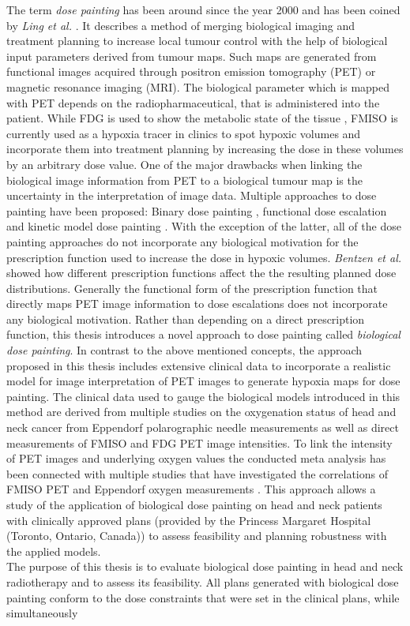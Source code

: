 The term \textit{dose painting} has been around since the year 2000 and has been coined by \textit{Ling et al.} \cite{pmid10837935}. It describes a method of merging biological imaging and treatment planning to increase local tumour control with the help of biological input parameters derived from tumour maps. Such maps are generated from functional images acquired through positron emission tomography (PET) or magnetic resonance imaging (MRI). The biological parameter which is mapped with PET depends on the radiopharmaceutical, that is administered into the patient. While FDG is used to show the metabolic state of the tissue \cite{pmid16841141}, FMISO is currently used as a hypoxia tracer in clinics to spot hypoxic volumes and incorporate them into treatment planning by increasing the dose in these volumes by an arbitrary dose value. One of the major drawbacks when linking the biological image information from PET to a biological tumour map is the uncertainty in the interpretation of image data. Multiple approaches to dose painting have been proposed: Binary dose painting \cite{pmid20855118, pmid11240261, pmid17869020}, functional dose escalation \cite{pmid12587912, pmid21356478, pmid20643512, pmid18635895} and kinetic model dose painting \cite{pmid17448882}. With the exception of the latter, all of the dose painting approaches do not incorporate any biological motivation for the prescription function used to increase the dose in hypoxic volumes. \textit{Bentzen et al.} \cite{pmid19218733} showed how different prescription functions affect the the resulting planned dose distributions. Generally the functional form of the prescription function that directly maps PET image information to dose escalations does not incorporate any biological motivation. Rather than depending on a direct prescription function, this thesis introduces a novel approach to dose painting called \textit{biological dose painting}. In contrast to the above mentioned concepts, the approach proposed in this thesis includes extensive clinical data to incorporate a realistic model for image interpretation of PET images to generate hypoxia maps for dose painting. The clinical data used to gauge the biological models introduced in this method are derived from multiple studies on the oxygenation status of head and neck cancer from Eppendorf polarographic needle measurements as well as direct measurements of FMISO and FDG PET image intensities. To link the intensity of PET images and underlying oxygen values the conducted meta analysis has been connected with multiple studies that have investigated the correlations of FMISO PET and Eppendorf oxygen measurements \cite{pmid17598907, pmid12865184, pmid20831480}. This approach allows a study of the application of biological dose painting on head and neck patients with clinically approved plans (provided by the Princess Margaret Hospital (Toronto, Ontario, Canada)) to assess feasibility and planning robustness with the applied models.\\The purpose of this thesis is to evaluate biological dose painting in head and neck radiotherapy and to assess its feasibility. All plans generated with biological dose painting conform to the dose constraints that were set in the clinical plans, while simultaneously 